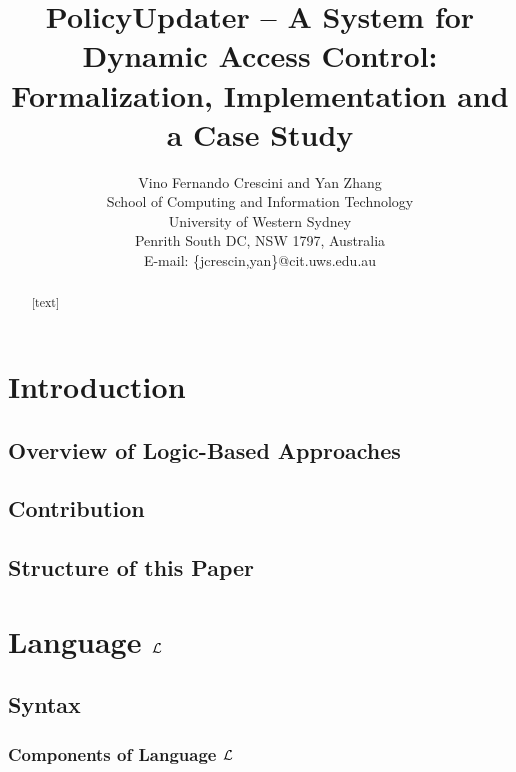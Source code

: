 \documentclass[10pt, twocolumn]{article}
\begin{document}
  \title{
    PolicyUpdater -- A System for Dynamic Access Control: \\
    Formalization, Implementation and a Case Study
  }

  \author{
    Vino Fernando Crescini and Yan Zhang \\
    School of Computing and Information Technology \\
    University of Western Sydney \\
    Penrith South DC, NSW 1797, Australia \\
    E-mail: \{jcrescin,yan\}@cit.uws.edu.au
  }

  \date{}

  \maketitle

  \begin{abstract}
    [text]
  \end{abstract}

  \section{Introduction}

    \subsection{Overview of Logic-Based Approaches}

    \subsection{Contribution}

    \subsection{Structure of this Paper}

  \section{Language $\cal{L}$}

    \subsection{Syntax}

      \subsubsection{Components of Language $\cal{L}$}
\end{document}
